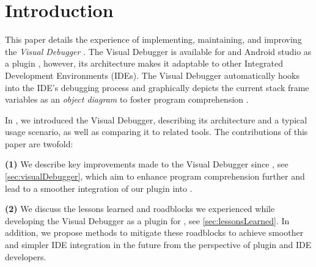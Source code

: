 \documentclass[sigconf]{acmart}
\begin{document}


\maketitle

\renewcommand\UrlFont{\color{blue}}

\section{Introduction}
This paper details the experience of implementing, maintaining, and improving the \textit{Visual Debugger} \cite{krauterVisualDebuggerTool2022}.
The Visual Debugger is available for \intellij{} and Android studio as a plugin \cite{timkrauterVisualDebuggerIntelliJ2024}, however, its architecture makes it adaptable to other Integrated Development Environments (IDEs).
The Visual Debugger automatically hooks into the IDE's debugging process and graphically depicts the current stack frame variables as an \textit{object diagram} to foster program comprehension \cite{krauterVisualDebuggerTool2022}.

In \cite{krauterVisualDebuggerTool2022}, we introduced the Visual Debugger, describing its architecture and a typical usage scenario, as well as comparing it to related tools.
The contributions of this paper are twofold:

\textbf{(1)} We describe key improvements made to the Visual Debugger since \cite{krauterVisualDebuggerTool2022}, see \autoref{sec:visualDebugger}, which aim to enhance program comprehension further and lead to a smoother integration of our plugin into \intellij{}.

\textbf{(2)} We discuss the lessons learned and roadblocks we experienced while developing the Visual Debugger as a plugin for \intellij{}, see \autoref{sec:lessonsLearned}.
In addition, we propose methods to mitigate these roadblocks to achieve smoother and simpler IDE integration in the future from the perspective of plugin and IDE developers. 
\end{document}
